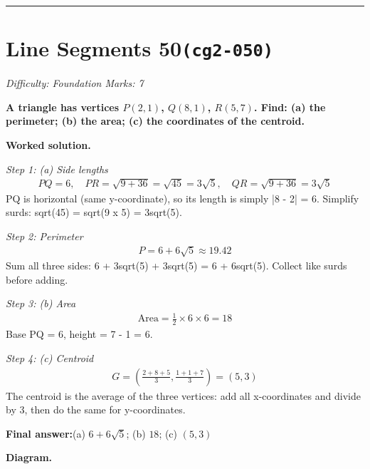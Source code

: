 \documentclass[11pt]{article}
\newcommand{\question}[1]{\par\medskip\noindent\textbf{#1}\par}
\begin{document}
\medskip\hrule

\section*{Line Segments 50\quad\small\texttt{(cg2-050)}}
\textit{Difficulty: Foundation \quad\textbar\quad Marks: 7}

\question{A triangle has vertices \( P(2, 1) \), \( Q(8, 1) \), \( R(5, 7) \). Find: (a) the perimeter; (b) the area; (c) the coordinates of the centroid.}

\textbf{Worked solution.}

\textit{Step 1: (a) Side lengths}
\[\begin{gathered}
PQ = 6, \quad PR = \sqrt{9+36} = \sqrt{45} = 3\sqrt{5}, \quad QR = \sqrt{9+36} = 3\sqrt{5}
\end{gathered}\]
PQ is horizontal (same y-coordinate), so its length is simply |8 - 2| = 6. Simplify surds: sqrt(45) = sqrt(9 x 5) = 3sqrt(5).

\textit{Step 2: Perimeter}
\[\begin{gathered}
P = 6 + 6\sqrt{5} \approx 19.42
\end{gathered}\]
Sum all three sides: 6 + 3sqrt(5) + 3sqrt(5) = 6 + 6sqrt(5). Collect like surds before adding.

\textit{Step 3: (b) Area}
\[\begin{gathered}
\text{Area} = \frac{1}{2} \times 6 \times 6 = 18
\end{gathered}\]
Base PQ = 6, height = 7 - 1 = 6.

\textit{Step 4: (c) Centroid}
\[\begin{gathered}
G = \left(\frac{2+8+5}{3}, \frac{1+1+7}{3}\right) = (5, 3)
\end{gathered}\]
The centroid is the average of the three vertices: add all x-coordinates and divide by 3, then do the same for y-coordinates.

\begin{answerbox}
\textbf{Final answer:}\quad (a) \(\displaystyle 6 + 6\sqrt{5}\); (b) \(\displaystyle 18\); (c) \(\displaystyle (5, 3)\)
\end{answerbox}
\textbf{Diagram.}
\end{document}
